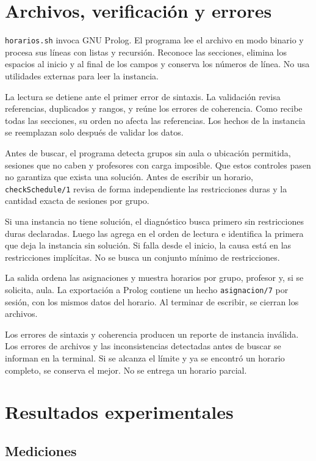 \documentclass[11pt]{article}
\begin{document}
\section{Archivos, verificación y errores}

\texttt{horarios.sh} invoca GNU Prolog. El programa lee el archivo en modo binario y procesa sus líneas con listas y recursión. Reconoce las secciones, elimina los espacios al inicio y al final de los campos y conserva los números de línea. No usa utilidades externas para leer la instancia.

La lectura se detiene ante el primer error de sintaxis. La validación revisa referencias, duplicados y rangos, y reúne los errores de coherencia. Como recibe todas las secciones, su orden no afecta las referencias. Los hechos de la instancia se reemplazan solo después de validar los datos.

Antes de buscar, el programa detecta grupos sin aula o ubicación permitida, sesiones que no caben y profesores con carga imposible. Que estos controles pasen no garantiza que exista una solución. Antes de escribir un horario, \texttt{checkSchedule/1} revisa de forma independiente las restricciones duras y la cantidad exacta de sesiones por grupo.

Si una instancia no tiene solución, el diagnóstico busca primero sin restricciones duras declaradas. Luego las agrega en el orden de lectura e identifica la primera que deja la instancia sin solución. Si falla desde el inicio, la causa está en las restricciones implícitas. No se busca un conjunto mínimo de restricciones.

La salida ordena las asignaciones y muestra horarios por grupo, profesor y, si se solicita, aula. La exportación a Prolog contiene un hecho \texttt{asignacion/7} por sesión, con los mismos datos del horario. Al terminar de escribir, se cierran los archivos.

Los errores de sintaxis y coherencia producen un reporte de instancia inválida. Los errores de archivos y las inconsistencias detectadas antes de buscar se informan en la terminal. Si se alcanza el límite y ya se encontró un horario completo, se conserva el mejor. No se entrega un horario parcial.

\section{Resultados experimentales}

\subsection{Mediciones}
\end{document}

